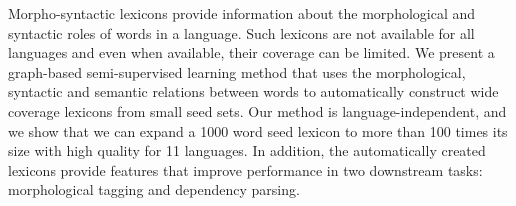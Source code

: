 Morpho-syntactic lexicons provide information about the morphological and syntactic roles of words in a language. Such lexicons are not available for all languages and even when available, their coverage can be limited. We present a graph-based semi-supervised learning method that uses the morphological, syntactic and semantic relations between words to automatically construct wide coverage lexicons from small seed sets. Our method is language-independent, and we show that we can expand a 1000 word seed lexicon to more than 100 times its size with high quality for 11 languages. In addition, the automatically created lexicons provide features that improve performance in two downstream tasks: morphological tagging and dependency parsing.
